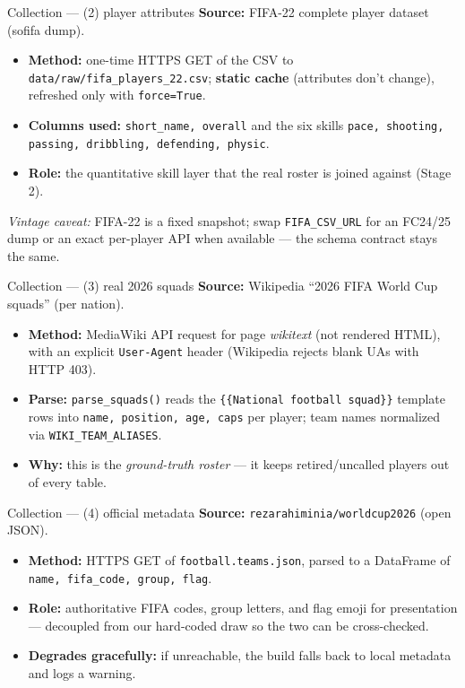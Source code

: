 \documentclass[aspectratio=169]{beamer}
\begin{document}
\begin{frame}{Collection --- (2) player attributes}
\textbf{Source:} FIFA-22 complete player dataset (sofifa dump).
\begin{itemize}
  \item \textbf{Method:} one-time HTTPS GET of the CSV to
        \texttt{data/raw/fifa\_players\_22.csv}; \textbf{static cache}
        (attributes don't change), refreshed only with \texttt{force=True}.
  \item \textbf{Columns used:} \texttt{short\_name, overall} and the six skills
        \texttt{pace, shooting, passing, dribbling, defending, physic}.
  \item \textbf{Role:} the quantitative skill layer that the real roster is
        joined against (Stage 2).
\end{itemize}
\vspace{0.5em}
\footnotesize\emph{Vintage caveat:} FIFA-22 is a fixed snapshot; swap
\texttt{FIFA\_CSV\_URL} for an FC24/25 dump or an exact per-player API when
available --- the schema contract stays the same.
\end{frame}

\begin{frame}{Collection --- (3) real 2026 squads}
\textbf{Source:} Wikipedia ``2026 FIFA World Cup squads'' (per nation).
\begin{itemize}
  \item \textbf{Method:} MediaWiki API request for page \emph{wikitext}
        (not rendered HTML), with an explicit \texttt{User-Agent} header
        (Wikipedia rejects blank UAs with HTTP 403).
  \item \textbf{Parse:} \texttt{parse\_squads()} reads the
        \texttt{\{\{National football squad\}\}} template rows into
        \texttt{name, position, age, caps} per player; team names normalized
        via \texttt{WIKI\_TEAM\_ALIASES}.
  \item \textbf{Why:} this is the \emph{ground-truth roster} --- it keeps
        retired/uncalled players out of every table.
\end{itemize}
\end{frame}

\begin{frame}{Collection --- (4) official metadata}
\textbf{Source:} \texttt{rezarahiminia/worldcup2026} (open JSON).
\begin{itemize}
  \item \textbf{Method:} HTTPS GET of \texttt{football.teams.json}, parsed to a
        DataFrame of \texttt{name, fifa\_code, group, flag}.
  \item \textbf{Role:} authoritative FIFA codes, group letters, and flag emoji
        for presentation --- decoupled from our hard-coded draw so the two can
        be cross-checked.
  \item \textbf{Degrades gracefully:} if unreachable, the build falls back to
        local metadata and logs a warning.
\end{itemize}
\end{frame}
\end{document}
